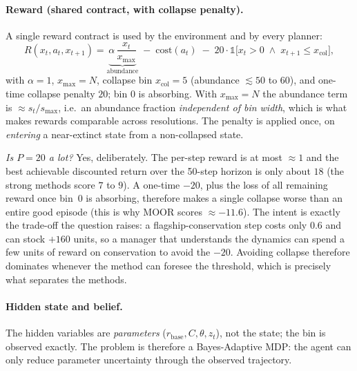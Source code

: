 \documentclass[11pt]{article}
\begin{document}
\paragraph{Reward (shared contract, with collapse penalty).} A single reward contract is
used by the environment and by every planner:
\begin{equation}
R(x_t, a_t, x_{t+1}) = \underbrace{\alpha\, \frac{x_t}{x_{\max}}}_{\text{abundance}}
\;-\; \mathrm{cost}(a_t)
\;-\; 20\cdot \mathbb{1}\big[x_t > 0 \;\wedge\; x_{t+1}\le x_{\text{col}}\big],
\label{eq:reward}
\end{equation}
with $\alpha=1$, $x_{\max}=N$, collapse bin $x_{\text{col}}=5$ (abundance $\lesssim 50$
to $60$), and one-time collapse penalty $20$; bin $0$ is absorbing. With $x_{\max}=N$
the abundance term is $\approx s_t/s_{\max}$, i.e.\ an abundance fraction
\emph{independent of bin width}, which is what makes rewards comparable across
resolutions. The penalty is applied once, on \emph{entering} a near-extinct state from a
non-collapsed state.

\emph{Is $P=20$ a lot?} Yes, deliberately. The per-step reward is at most $\approx 1$ and
the best achievable discounted return over the 50-step horizon is only about $18$ (the
strong methods score $7$ to $9$). A one-time $-20$, plus the loss of all remaining
reward once bin~0 is absorbing, therefore makes a single collapse worse than an entire
good episode (this is why MOOR scores $\approx -11.6$). The intent is exactly the
trade-off the question raises: a flagship-conservation step costs only $0.6$ and can stock
$+160$ units, so a manager that understands the dynamics can spend a few units of reward
on conservation to avoid the $-20$. Avoiding collapse therefore dominates whenever the
method can foresee the threshold, which is precisely what separates the methods.

\paragraph{Hidden state and belief.} The hidden variables are \emph{parameters}
($r_{\text{base}}, C, \theta, z_t$), not the state; the bin is observed exactly. The
problem is therefore a Bayes-Adaptive MDP: the agent can only reduce parameter
uncertainty through the observed trajectory.
\end{document}
